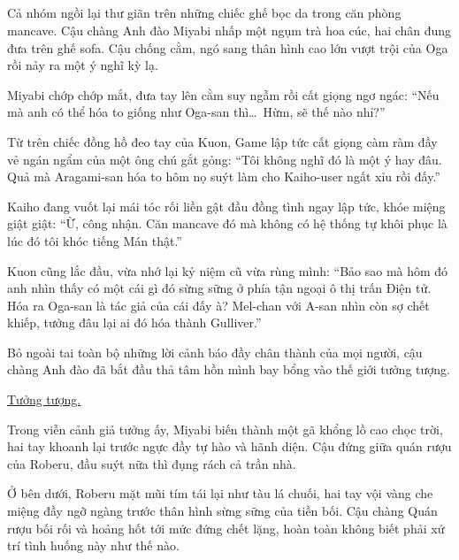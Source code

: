 \documentclass[../main.tex]{subfiles}
\begin{document}
\subsection*{\label{ep-M8.IV}}
\vspace{-4pt}

Cả nhóm ngồi lại thư giãn trên những chiếc ghế bọc da trong căn phòng mancave. Cậu chàng Anh đào Miyabi nhấp một ngụm trà hoa cúc, hai chân đung đưa trên ghế sofa. Cậu chống cằm, ngó sang thân hình cao lớn vượt trội của Oga rồi nảy ra một ý nghĩ kỳ lạ.

Miyabi chớp chớp mắt, đưa tay lên cằm suy ngẫm rồi cất giọng ngơ ngác: ``Nếu mà anh có thể hóa to giống như Oga-san thì\dots\ Hừm, sẽ thế nào nhỉ?''

Từ trên chiếc đồng hồ đeo tay của Kuon, Game lập tức cất giọng càm ràm đầy vẻ ngán ngẩm của một ông chú gắt gỏng: ``Tôi không nghĩ đó là một ý hay đâu. Quả mà Aragami-san hóa to hôm nọ suýt làm cho Kaiho-user ngất xỉu rồi đấy.''

Kaiho đang vuốt lại mái tóc rối liền gật đầu đồng tình ngay lập tức, khóe miệng giật giật: ``Ừ, công nhận. Căn mancave đó mà không có hệ thống tự khôi phục là lúc đó tôi khóc tiếng Mán thật.''

Kuon cũng lắc đầu, vừa nhớ lại kỷ niệm cũ vừa rùng mình: ``Bảo sao mà hôm đó anh nhìn thấy có một cái gì đó sừng sững ở phía tận ngoại ô thị trấn Điện tử. Hóa ra Oga-san là tác giả của cái đấy à? Mel-chan với A-san nhìn còn sợ chết khiếp, tưởng đâu lại ai đó hóa thành Gulliver.''

Bỏ ngoài tai toàn bộ những lời cảnh báo đầy chân thành của mọi người, cậu chàng Anh đào đã bắt đầu thả tâm hồn mình bay bổng vào thế giới tưởng tượng.

\begin{center}
  \uline{Tưởng tượng.}
\end{center}

Trong viễn cảnh giả tưởng ấy, Miyabi biến thành một gã khổng lồ cao chọc trời, hai tay khoanh lại trước ngực đầy tự hào và hãnh diện. Cậu đứng giữa quán rượu của Roberu, đầu suýt nữa thì đụng rách cả trần nhà.

Ở bên dưới, Roberu mặt mũi tím tái lại như tàu lá chuối, hai tay vội vàng che miệng đầy ngỡ ngàng trước thân hình sừng sững của tiền bối. Cậu chàng Quán rượu bối rối và hoảng hốt tới mức đứng chết lặng, hoàn toàn không biết phải xử trí tình huống này như thế nào.
\end{document}
